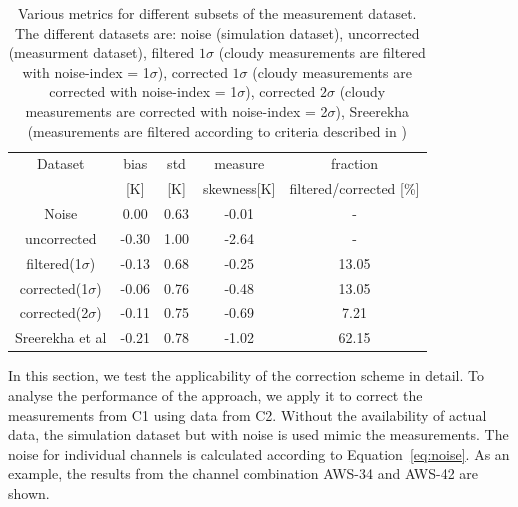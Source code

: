\documentclass[12pt]{article}
\begin{document}
\begin{table}[!bt]
	\centering
	\begin{tabular}[b]{c|c|c|c|c}
		Dataset  		  &   bias &   std &   measure  & fraction  \\
		&   [K]  &   [K] & skewness[K] & filtered/corrected [\%]\\
		\hline
Noise             &   0.00 &  0.63 &              -0.01 &                - \\
uncorrected       &  -0.30 &  1.00 &              -2.64 &                - \\
filtered(1$\sigma$)   &  -0.13 &  0.68 &              -0.25 &             13.05 \\
corrected(1$\sigma$) &  -0.06 &  0.76 &              -0.48 &               13.05 \\
corrected(2$\sigma$) &  -0.11 &  0.75 &              -0.69 &                7.21 \\
Sreerekha et al   &  -0.21 &  0.78 &              -1.02 &               62.15 \\

		\hline
	\end{tabular}
	\caption{Various metrics for different subsets of the measurement dataset. The different datasets are: noise (simulation dataset), uncorrected (measurment dataset), filtered $1\sigma$ (cloudy measurements are filtered with noise-index = 1$\sigma$), corrected $1\sigma$ (cloudy measurements are corrected with noise-index = 1$\sigma$), corrected $2\sigma$ (cloudy measurements are corrected with noise-index = 2$\sigma$), Sreerekha (measurements are filtered according to criteria described in \cite{rekha2012potential})   }
	\label{tab:correction:stats:34:42}
\end{table}
%
In this section, we test the applicability of the correction scheme in detail. To analyse the performance of the approach, we apply it to correct the measurements from C1 using data from C2. Without the availability of actual data, the simulation dataset but with noise is used mimic the measurements. The noise for individual channels is calculated according to Equation~\ref{eq:noise}. As an example, the results from the channel combination AWS-34 and AWS-42 are shown.
\end{document}
